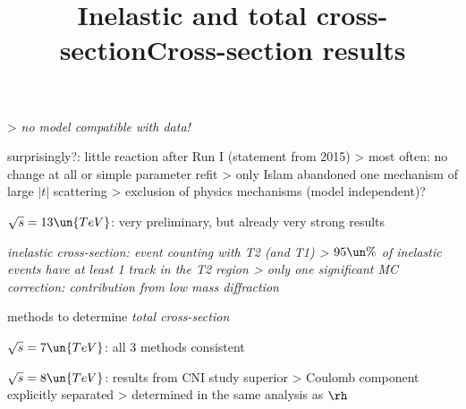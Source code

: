 \centerline{}

\>> \em{no model compatible with data!}

\> surprisingly?: little reaction after Run I (statement from 2015)
\>> most often: no change at all or simple parameter refit
\>> only Islam abandoned one mechanism of large $|t|$ scattering
\>> exclusion of physics mechanisms (model independent)?

\newpage %

\> $\sqrt s = 13\un{TeV}$: very preliminary, but already very strong results

\centerline{%
	\hskip1mm
}


\newpage %
\title{Inelastic and total cross-section}

\> \em{inelastic cross-section}: event counting with T2 (and T1)
\>> $95\un{\%}$ of inelastic events have at least 1 track in the T2 region
\>> only one significant MC correction: contribution from low mass diffraction

 methods to determine \em{total cross-section}

\centerline{}



\newpage %
\title{Cross-section results}

\centerline{%
	\hskip2mm
}

\> $\sqrt s = 7\un{TeV}$: all 3 methods consistent

\> $\sqrt s = 8\un{TeV}$: results from CNI study superior
\>> Coulomb component explicitly separated
\>> determined in the same analysis as $\rh$

